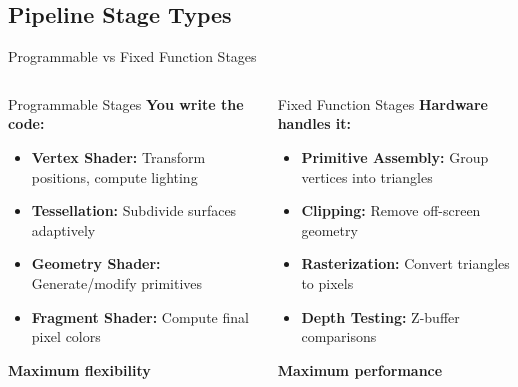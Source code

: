 \subsection{Pipeline Stage Types}
\begin{frame}{Programmable vs Fixed Function Stages}
  \begin{columns}
    \small
    \begin{column}{0.5\textwidth}
      \begin{raybox}{Programmable Stages}
        \textbf{You write the code:}
        \begin{itemize}
          \item \textbf{Vertex Shader:} Transform positions, compute lighting
          \item \textbf{Tessellation:} Subdivide surfaces adaptively
          \item \textbf{Geometry Shader:} Generate/modify primitives
          \item \textbf{Fragment Shader:} Compute final pixel colors
        \end{itemize}

        \vspace{0.2cm}
        \textcolor{PrimaryColor}{\textbf{Maximum flexibility}}
      \end{raybox}
    \end{column}
    \pause
    \begin{column}{0.5\textwidth}
      \begin{conceptbox}{Fixed Function Stages}
        \textbf{Hardware handles it:}
        \begin{itemize}
          \item \textbf{Primitive Assembly:} Group vertices into triangles
          \item \textbf{Clipping:} Remove off-screen geometry
          \item \textbf{Rasterization:} Convert triangles to pixels
          \item \textbf{Depth Testing:} Z-buffer comparisons
        \end{itemize}

        \vspace{0.2cm}
        \textcolor{SecondaryColor}{\textbf{Maximum performance}}
      \end{conceptbox}
    \end{column}
  \end{columns}
\end{frame}
